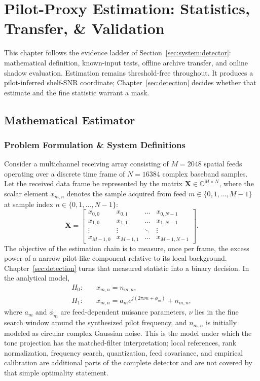 
\chapter{Pilot-Proxy Estimation: Statistics, Transfer, \& Validation}
\label{sec:estimator}
\label{sec:pipeline}

This chapter follows the evidence ladder of Section~\ref{sec:system:detector}: mathematical definition, known-input tests, offline archive transfer, and online shadow evaluation. Estimation remains threshold-free throughout. It produces a pilot-inferred shelf-SNR coordinate; Chapter~\ref{sec:detection} decides whether that estimate and the fine statistic warrant a mask.

\section{Mathematical Estimator}

\subsection{Problem Formulation \& System Definitions}
\label{sec:pipeline:problem}

Consider a multichannel receiving array consisting of $M = 2048$ spatial feeds operating over a discrete time frame of $N = 16384$ complex baseband samples. Let the received data frame be represented by the matrix $\mathbf{X} \in \mathbb{C}^{M \times N}$, where the scalar element $x_{m,n}$ denotes the sample acquired from feed $m \in \{0, 1, \dots, M-1\}$ at sample index $n \in \{0, 1, \dots, N-1\}$:
\begin{equation}
\mathbf{X} = \begin{bmatrix}
x_{0,0} & x_{0,1} & \dots & x_{0, N-1} \\
x_{1,0} & x_{1,1} & \dots & x_{1, N-1} \\
\vdots & \vdots & \ddots & \vdots \\
x_{M-1,0} & x_{M-1,1} & \dots & x_{M-1, N-1}
\end{bmatrix}.
\end{equation}
The objective of the estimation chain is to measure, once per frame, the excess power of a narrow pilot-like component relative to its local background. Chapter~\ref{sec:detection} turns that measured statistic into a binary decision. In the analytical model,
\begin{align}
H_0: &\quad x_{m,n}=n_{m,n}, \\
H_1: &\quad x_{m,n}=a_m e^{j(2\pi \nu n+\phi_m)}+n_{m,n},
\end{align}
where $a_m$ and $\phi_m$ are feed-dependent nuisance parameters, $\nu$ lies in the fine search window around the synthesized pilot frequency, and $n_{m,n}$ is initially modeled as circular complex Gaussian noise.  This is the model under which the tone projection has the matched-filter interpretation; local references, rank normalization, frequency search, quantization, feed covariance, and empirical calibration are additional parts of the complete detector and are not covered by that simple optimality statement.

